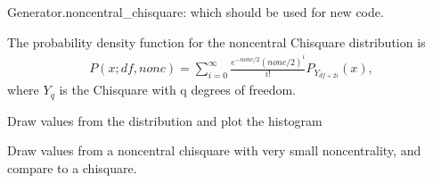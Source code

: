 \documentclass[letterpaper,10pt,english]{sphinxmanual}
\begin{document}
\begin{fulllineitems}
\begin{description}
\end{description}

Generator.noncentral\_chisquare: which should be used for new code.

The probability density function for the noncentral Chi\sphinxhyphen{}square
distribution is
\begin{equation*}
\begin{split}P(x;df,nonc) = \sum^{\infty}_{i=0}
\frac{e^{-nonc/2}(nonc/2)^{i}}{i!}
P_{Y_{df+2i}}(x),\end{split}
\end{equation*}
where \(Y_{q}\) is the Chi\sphinxhyphen{}square with q degrees of freedom.

Draw values from the distribution and plot the histogram

\begin{sphinxVerbatim}[commandchars=\\\{\}]
   
    
                   
\end{sphinxVerbatim}

Draw values from a noncentral chisquare with very small noncentrality,
and compare to a chisquare.


\end{fulllineitems}
\end{document}
